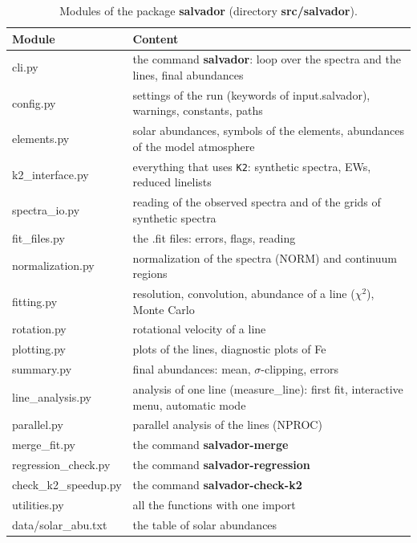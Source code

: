 \documentclass[modern]{aastex701}
\begin{document}
\begin{table}[h]
    \centering
    \caption{Modules of the package {\bf salvador} (directory {\bf src/salvador}).}
    \label{tab:modules}
    \begin{tabular}{lp{10.5cm}}
        \hline
        Module & Content \\
        \hline
        cli.py & the command {\bf salvador}: loop over the spectra and the lines, final abundances \\
        config.py & settings of the run (keywords of input.salvador), warnings, constants, paths \\
        elements.py & solar abundances, symbols of the elements, abundances of the model atmosphere \\
        k2\_interface.py & everything that uses \texttt{K2}: synthetic spectra, EWs, reduced linelists \\
        spectra\_io.py & reading of the observed spectra and of the grids of synthetic spectra \\
        fit\_files.py & the .fit files: errors, flags, reading \\
        normalization.py & normalization of the spectra (NORM) and continuum regions \\
        fitting.py & resolution, convolution, abundance of a line ($\chi^2$), Monte Carlo \\
        rotation.py & rotational velocity of a line \\
        plotting.py & plots of the lines, diagnostic plots of Fe \\
        summary.py & final abundances: mean, $\sigma$-clipping, errors \\
        line\_analysis.py & analysis of one line (measure\_line): first fit, interactive menu, automatic mode \\
        parallel.py & parallel analysis of the lines (NPROC) \\
        merge\_fit.py & the command {\bf salvador-merge} \\
        regression\_check.py & the command {\bf salvador-regression} \\
        check\_k2\_speedup.py & the command {\bf salvador-check-k2} \\
        utilities.py & all the functions with one import \\
        data/solar\_abu.txt & the table of solar abundances \\
        \hline
    \end{tabular}
\end{table}
\end{document}
